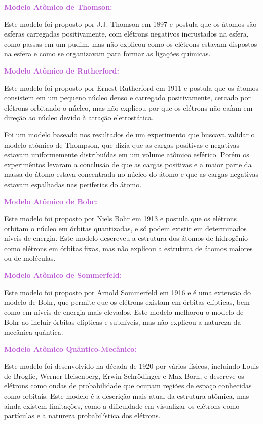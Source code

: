\documentclass[11pt,a4paper]{article}
\begin{document}
            
	\textcolor{MediumOrchid}{\Large\LobsterTwo\textbf{Modelo Atômico de Thomson:}}
            

        Este modelo foi proposto por J.J. Thomson em 1897 e postula que os átomos são esferas carregadas positivamente, com elétrons negativos incrustados na esfera, como passas em um pudim, mas não explicou como os elétrons estavam dispostos na esfera e como se organizavam para formar as ligações químicas.

            
    \textcolor{MediumOrchid}{\Large\LobsterTwo\textbf{Modelo Atômico de Rutherford:}}
            

    	Este modelo foi proposto por Ernest Rutherford em 1911 e postula que os átomos consistem em um pequeno núcleo denso e carregado positivamente, cercado por elétrons orbitando o núcleo, mas não explicou por que os elétrons não caíam em direção ao núcleo devido à atração eletrostática.

		Foi um modelo baseado nos resultados de um experimento que buscava validar o modelo atômico de Thompson, que dizia que as cargas positivas e negativas estavam uniformemente distribuídas em um volume atômico esférico. Porém os experimêntos levaram a conclusão de que as cargas positivas e a maior parte da massa do átomo estava concentrada no núcleo do átomo e que as cargas negativas estavam espalhadas nas periferias do átomo.


    \textcolor{MediumOrchid}{\Large\LobsterTwo\textbf{Modelo Atômico de Bohr:}}


        Este modelo foi proposto por Niels Bohr em 1913 e postula que os elétrons orbitam o núcleo em órbitas quantizadas, e só podem existir em determinados níveis de energia. Este modelo descreveu a estrutura dos átomos de hidrogênio como elétrons em órbitas fixas, mas não explicou a estrutura de átomos maiores ou de moléculas.

	\textcolor{MediumOrchid}{\Large\LobsterTwo\textbf{Modelo Atômico de Sommerfeld:}}

        Este modelo foi proposto por Arnold Sommerfeld em 1916 e é uma extensão do modelo de Bohr, que permite que os elétrons existam em órbitas elípticas, bem como em níveis de energia mais elevados. Este modelo melhorou o modelo de Bohr ao incluir órbitas elípticas e subníveis, mas não explicou a natureza da mecânica quântica.

    \textcolor{MediumOrchid}{\Large\LobsterTwo\textbf{Modelo Atômico Quântico-Mecânico:}}

        Este modelo foi desenvolvido na década de 1920 por vários físicos, incluindo Louis de Broglie, Werner Heisenberg, Erwin Schrödinger e Max Born, e descreve os elétrons como ondas de probabilidade que ocupam regiões de espaço conhecidas como orbitais. Este modelo é a descrição mais atual da estrutura atômica, mas ainda existem limitações, como a dificuldade em visualizar os elétrons como partículas e a natureza probabilística dos elétrons.
        
\end{document}
